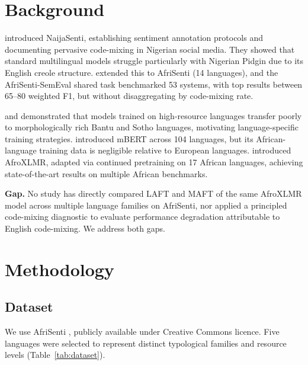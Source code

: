 \documentclass[11pt,twocolumn]{article}
\begin{document}
\section{Background}

\citet{muhammad-etal-2022-naijasenti} introduced NaijaSenti, establishing sentiment annotation
protocols and documenting pervasive code-mixing in Nigerian social media. They showed that standard
multilingual models struggle particularly with Nigerian Pidgin due to its English creole structure.
\citet{muhammad-etal-2023-afrisenti} extended this to AfriSenti (14 languages), and the
AfriSenti-SemEval shared task \cite{muhammad-etal-2023-semeval} benchmarked 53 systems, with top
results between 65--80 weighted F1, but without disaggregating by code-mixing rate.

\citet{mabokela-schlippe-2022} and \citet{mokhosi-etal-2024} demonstrated that models trained on
high-resource languages transfer poorly to morphologically rich Bantu and Sotho languages,
motivating language-specific training strategies. \citet{devlin-etal-2019-bert} introduced mBERT
across 104 languages, but its African-language training data is negligible relative to European
languages. \citet{alabi-etal-2022-adapting} introduced AfroXLMR, adapted via continued pretraining
on 17 African languages, achieving state-of-the-art results on multiple African benchmarks.

\textbf{Gap.} No study has directly compared LAFT and MAFT of the same AfroXLMR model across
multiple language families on AfriSenti, nor applied a principled code-mixing diagnostic to
evaluate performance degradation attributable to English code-mixing. We address both gaps.

\section{Methodology}

\subsection{Dataset}

We use AfriSenti \cite{muhammad-etal-2023-afrisenti}, publicly available under Creative
Commons licence. Five languages were selected to represent distinct typological families and
resource levels (Table~\ref{tab:dataset}).
\end{document}
